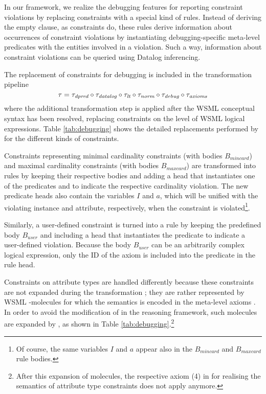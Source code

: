 In our framework, we realize the debugging features for reporting constraint violations by replacing constraints with a special
kind of rules. Instead of deriving the empty clause, as
constraints do, these rules derive information about occurrences of
constraint violations by instantiating debugging-specific
meta-level predicates with the entities involved in a violation.
Such a way, information about constraint violations can be
queried using Datalog inferencing.

The replacement of constraints for debugging is included in the
transformation pipeline
\begin{displaymath}
    \tau = \tau_{\textit{\scriptsize{dpred}}} \circ \tau_{\textit{\scriptsize{datalog}}} \circ \tau_{\textit{\scriptsize{lt}}} \circ \tau_{\textit{\scriptsize{norm}}} \circ \tau_{\textit{\scriptsize{debug}}} \circ \tau_{\textit{\scriptsize{axioms}}}
\end{displaymath}
where the additional transformation step \transdebug is applied
after the WSML conceptual syntax has been resolved, replacing
constraints on the level of WSML logical expressions. Table
\ref{tab:debugging} shows the detailed replacements performed by
\transdebug for the different kinds of constraints.

Constraints representing minimal cardinality constraints (with bodies $B_{mincard}$) and maximal cardinality constraints (with bodies $B_{maxcard}$) are transformed into rules by keeping their respective
bodies and adding a head that instantiates one of the predicates
\pvmincard and \pvmaxcard to indicate the respective cardinality
violation. The new predicate heads also contain the variables $I$ and $a$, which will be unified with the violating instance and attribute, respectively, when the constraint is violated\footnote{Of course, the same variables $I$ and $a$ appear also in the $B_{mincard}$ and $B_{maxcard}$ rule bodies.}. 

Similarly, a user-defined constraint is turned into a rule by
keeping the predefined body $B_{user}$ and including a head that
instantiates the predicate \pvuser to indicate a user-defined
violation. Because the body $B_{user}$ can be an arbitrarily complex
logical expression, only the \axiomid ID of the axiom is included into the predicate in the rule head.

Constraints on attribute types are handled differently
because these constraints are not expanded during the
transformation \transax ; they are rather represented by WSML
-molecules for which the semantics is encoded in the
meta-level axioms \mlaxioms. In order to avoid the modification of
\mlaxioms in the reasoning framework, such molecules are expanded
by \transdebug, as shown in Table
\ref{tab:debugging}.\footnote{After this expansion of
 molecules, the respective axiom (4) in \mlaxioms for
realising the semantics of attribute type constraints does not
apply anymore.}

